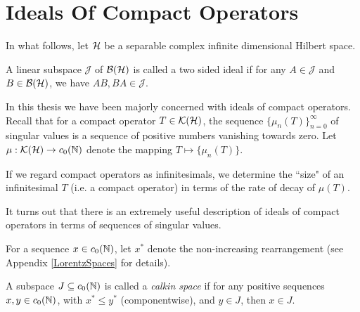 
\chapter{Ideals Of Compact Operators} %

\label{IdealsOfOperators} %



In what follows, let $\mathcal{H}$ be a separable complex infinite dimensional Hilbert space.
\begin{definition}
    A linear subspace $\mathcal{J}$ of $\mathcal{B}(\mathcal{H})$ is called a two
    sided ideal
    if for any $A \in \mathcal{J}$ and $B \in \mathcal{B}(\mathcal{H})$, we
    have $AB,BA \in \mathcal{J}$.
\end{definition}

In this thesis we have been majorly concerned with
ideals of compact operators. Recall
that for a compact operator $T \in \mathcal{K}(\mathcal{H})$,
the sequence $\{\mu_n(T)\}_{n=0}^\infty$ of singular
values is a sequence of positive numbers vanishing towards zero. Let
$\mu:\mathcal{K}(\mathcal{H})\to c_0(\mathbb{N})$ denote the mapping
$T \mapsto \{\mu_n(T)\}$. 

If we regard compact operators as infinitesimals, we determine
the ``size" of an infinitesimal $T$ (i.e. a compact operator)
in terms of the rate of decay of $\mu(T)$. 

 It turns out that there is
an extremely useful description of ideals of compact operators
in terms of sequences of singular values. 

\begin{definition}
    For a sequence $x \in c_0(\mathbb{N})$, let $x^*$
    denote the non-increasing rearrangement (see Appendix \ref{LorentzSpaces}
    for details).

    A subspace $J \subseteq c_0(\mathbb{N})$ is called a 
    \emph{calkin space} 
    if for any positive sequences $x,y \in c_0(\mathbb{N})$,
    with $x^* \leq y^*$ (componentwise), and $y \in J$,
    then $x \in J$.
\end{definition}

